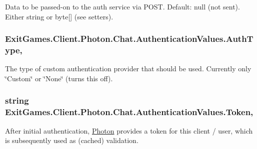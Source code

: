 Data to be passed-\/on to the auth service via P\+O\+ST. Default\+: null (not sent). Either string or byte\mbox{[}\mbox{]} (see setters).

\subsubsection[{\texorpdfstring{Auth\+Type}{AuthType}}]{ Exit\+Games.\+Client.\+Photon.\+Chat.\+Authentication\+Values.\+Auth\+Type\hspace{0.3cm}{\ttfamily [get]}, {\ttfamily [set]}}\hypertarget{class_exit_games_1_1_client_1_1_photon_1_1_chat_1_1_authentication_values_a8736f9ea3a807749dfe4bdbab4d4ff5a}{}\label{class_exit_games_1_1_client_1_1_photon_1_1_chat_1_1_authentication_values_a8736f9ea3a807749dfe4bdbab4d4ff5a}


The type of custom authentication provider that should be used. Currently only \char`\"{}\+Custom\char`\"{} or \char`\"{}\+None\char`\"{} (turns this off).

\subsubsection[{\texorpdfstring{Token}{Token}}]{\setlength{\rightskip}{0pt plus 5cm}string Exit\+Games.\+Client.\+Photon.\+Chat.\+Authentication\+Values.\+Token\hspace{0.3cm}{\ttfamily [get]}, {\ttfamily [set]}}\hypertarget{class_exit_games_1_1_client_1_1_photon_1_1_chat_1_1_authentication_values_a400c002afb41d2ea2a2288e3d010afa6}{}\label{class_exit_games_1_1_client_1_1_photon_1_1_chat_1_1_authentication_values_a400c002afb41d2ea2a2288e3d010afa6}


After initial authentication, \hyperlink{namespace_exit_games_1_1_client_1_1_photon}{Photon} provides a token for this client / user, which is subsequently used as (cached) validation.

